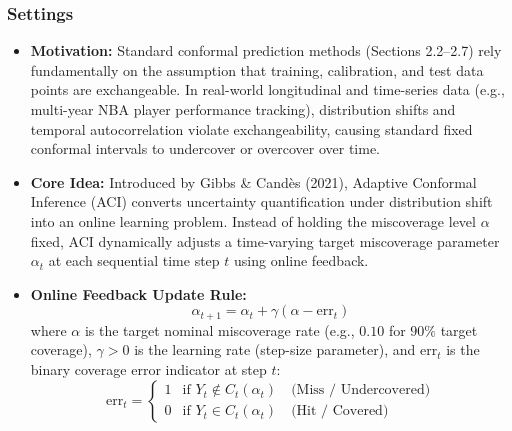 \documentclass[11pt,a4paper]{article}
\begin{document}
\subsubsection{Settings}
\begin{itemize}
    \item \textbf{Motivation:} Standard conformal prediction methods (Sections 2.2--2.7) rely fundamentally on the assumption that training, calibration, and test data points are exchangeable. In real-world longitudinal and time-series data (e.g., multi-year NBA player performance tracking), distribution shifts and temporal autocorrelation violate exchangeability, causing standard fixed conformal intervals to undercover or overcover over time.
    
    \item \textbf{Core Idea:} Introduced by Gibbs \& Cand{\`e}s (2021), Adaptive Conformal Inference (ACI) converts uncertainty quantification under distribution shift into an online learning problem. Instead of holding the miscoverage level $\alpha$ fixed, ACI dynamically adjusts a time-varying target miscoverage parameter $\alpha_t$ at each sequential time step $t$ using online feedback.
    
    \item \textbf{Online Feedback Update Rule:}
    \[
    \alpha_{t+1} = \alpha_t + \gamma (\alpha - \text{err}_t)
    \]
    where $\alpha$ is the target nominal miscoverage rate (e.g., $0.10$ for $90\%$ target coverage), $\gamma > 0$ is the learning rate (step-size parameter), and $\text{err}_t$ is the binary coverage error indicator at step $t$:
    \[
    \text{err}_t = 
    \begin{cases} 
    1 & \text{if } Y_t \notin C_t(\alpha_t) \quad \text{(Miss / Undercovered)} \\ 
    0 & \text{if } Y_t \in C_t(\alpha_t) \quad \text{(Hit / Covered)} 
    \end{cases}
    \]
\end{itemize}
\end{document}
